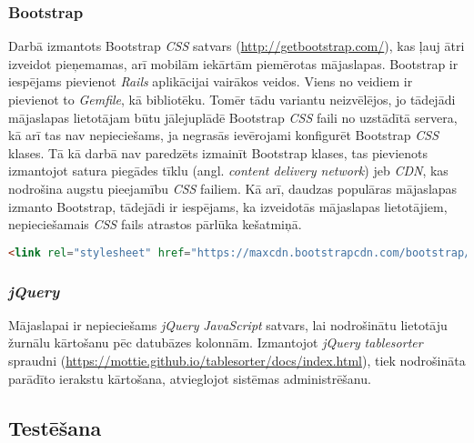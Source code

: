 \subsubsection{Bootstrap}
Darbā izmantots Bootstrap \textit{CSS}  satvars (\url{http://getbootstrap.com/}), kas ļauj ātri izveidot pieņemamas, arī mobilām iekārtām piemērotas mājaslapas.
Bootstrap ir iespējams pievienot \textit{Rails} aplikācijai vairākos veidos. Viens no veidiem ir pievienot to \textit{Gemfile}, kā bibliotēku. Tomēr tādu variantu neizvēlējos, jo tādejādi mājaslapas lietotājam būtu jālejuplādē Bootstrap \textit{CSS}  faili no uzstādītā servera, kā arī tas nav nepieciešams, ja negrasās ievērojami konfigurēt Bootstrap \textit{CSS}  klases.
Tā kā darbā nav paredzēts izmainīt Bootstrap klases, tas pievienots izmantojot satura piegādes tīklu (angl. \textit{content delivery network}) jeb \textit{CDN}, kas nodrošina augstu pieejamību \textit{CSS}  failiem. Kā arī, daudzas populāras mājaslapas izmanto Bootstrap, tādejādi ir iespējams, ka izveidotās mājaslapas lietotājiem, nepieciešamais \textit{CSS}  fails atrastos pārlūka kešatmiņā.
\begin{lstlisting}[language=HTML]
<link rel="stylesheet" href="https://maxcdn.bootstrapcdn.com/bootstrap/3.3.6/css/bootstrap.min.css" integrity="sha384-1q8mTJOASx8j1Au+a5WDVnPi2lkFfwwEAa8hDDdjZlpLegxhjVME1fgjWPGmkzs7" crossorigin="anonymous">
\end{lstlisting}

\subsubsection{\textit{jQuery}}
Mājaslapai ir nepieciešams \textit{jQuery} \textit{JavaScript}  satvars, lai nodrošinātu lietotāju žurnālu kārtošanu pēc datubāzes kolonnām. Izmantojot \textit{jQuery} \textit{tablesorter} spraudni (\url{https://mottie.github.io/tablesorter/docs/index.html}), tiek nodrošināta parādīto ierakstu kārtošana, atvieglojot sistēmas administrēšanu.

\subsection{Testēšana} \label{Testing}

